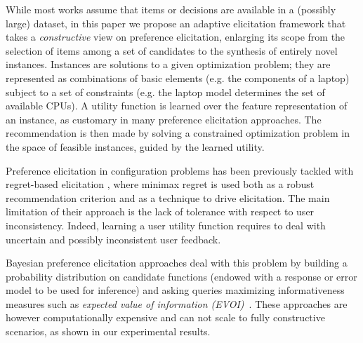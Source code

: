 \documentclass{article}
\renewcommand\[{\begin{equation}}
\renewcommand\]{\end{equation}}
\begin{document}


While most works assume that items or decisions are available in a (possibly large)
dataset, in this paper we propose an adaptive elicitation framework that takes a {\em constructive} view on preference
elicitation, enlarging its scope from the selection of items among a
set of candidates to the synthesis of entirely novel instances. 
Instances are solutions to a given optimization problem; they are represented as combinations of basic elements
(e.g. the components of a laptop) subject to a set of constraints
(e.g. the laptop model determines the set of available CPUs). 
A utility function is learned over the feature representation of an
instance, as customary in many preference elicitation approaches. 
The recommendation is then made by solving a constrained optimization
 problem in the space of feasible instances, guided by the learned
utility. 

Preference elicitation in configuration problems has been previously
tackled with regret-based elicitation
\cite{boutilier2006,braziunas2007}, where minimax regret is used both
as a robust recommendation criterion and as a technique to drive
elicitation.  The main limitation of their
approach is the lack of tolerance with respect to user
inconsistency. %
Indeed, learning a user utility function requires 
to deal with uncertain and possibly inconsistent user feedback.  

Bayesian preference elicitation
approaches deal with this problem by 
building a probability
distribution on candidate functions (endowed with a response or error
model to be used for inference) and asking queries maximizing
informativeness measures such as {\em expected value of information
(EVOI)}~\cite{chajewska2000,guo2010real,viappiani2010optimal}.  
These
approaches are however computationally expensive and can not scale to
fully constructive scenarios, as shown in our experimental results.
\end{document}
